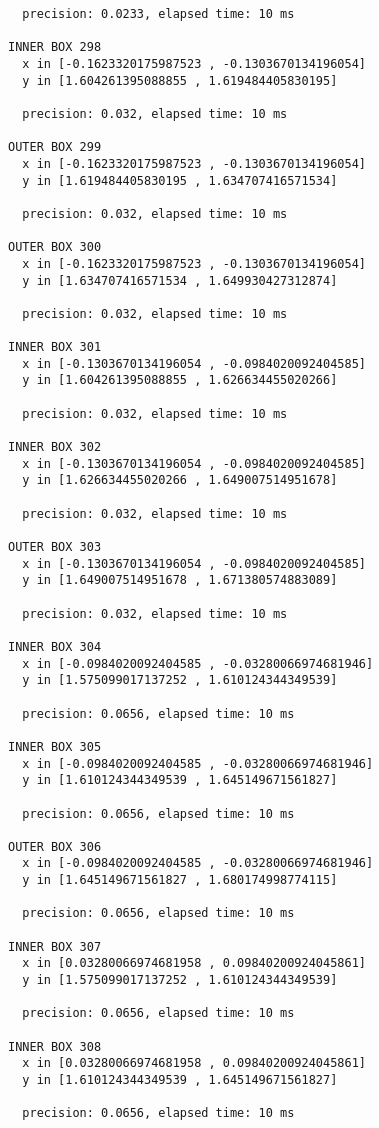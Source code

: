 \begin{verbatim}
  precision: 0.0233, elapsed time: 10 ms

INNER BOX 298
  x in [-0.1623320175987523 , -0.1303670134196054]
  y in [1.604261395088855 , 1.619484405830195]

  precision: 0.032, elapsed time: 10 ms

OUTER BOX 299
  x in [-0.1623320175987523 , -0.1303670134196054]
  y in [1.619484405830195 , 1.634707416571534]

  precision: 0.032, elapsed time: 10 ms

OUTER BOX 300
  x in [-0.1623320175987523 , -0.1303670134196054]
  y in [1.634707416571534 , 1.649930427312874]

  precision: 0.032, elapsed time: 10 ms

INNER BOX 301
  x in [-0.1303670134196054 , -0.0984020092404585]
  y in [1.604261395088855 , 1.626634455020266]

  precision: 0.032, elapsed time: 10 ms

INNER BOX 302
  x in [-0.1303670134196054 , -0.0984020092404585]
  y in [1.626634455020266 , 1.649007514951678]

  precision: 0.032, elapsed time: 10 ms

OUTER BOX 303
  x in [-0.1303670134196054 , -0.0984020092404585]
  y in [1.649007514951678 , 1.671380574883089]

  precision: 0.032, elapsed time: 10 ms

INNER BOX 304
  x in [-0.0984020092404585 , -0.03280066974681946]
  y in [1.575099017137252 , 1.610124344349539]

  precision: 0.0656, elapsed time: 10 ms

INNER BOX 305
  x in [-0.0984020092404585 , -0.03280066974681946]
  y in [1.610124344349539 , 1.645149671561827]

  precision: 0.0656, elapsed time: 10 ms

OUTER BOX 306
  x in [-0.0984020092404585 , -0.03280066974681946]
  y in [1.645149671561827 , 1.680174998774115]

  precision: 0.0656, elapsed time: 10 ms

INNER BOX 307
  x in [0.03280066974681958 , 0.09840200924045861]
  y in [1.575099017137252 , 1.610124344349539]

  precision: 0.0656, elapsed time: 10 ms

INNER BOX 308
  x in [0.03280066974681958 , 0.09840200924045861]
  y in [1.610124344349539 , 1.645149671561827]

  precision: 0.0656, elapsed time: 10 ms


\end{verbatim}
